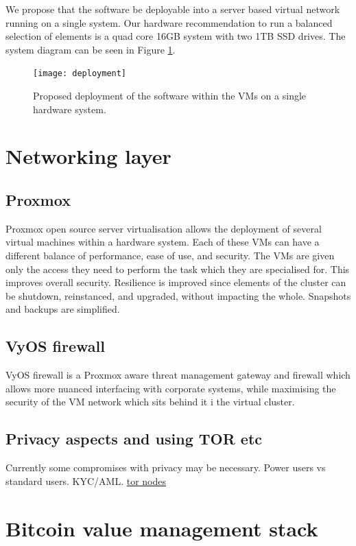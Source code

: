 We propose that the software be deployable into a server based virtual network running on a single system. Our hardware recommendation to run a balanced selection of elements is a quad core 16GB system with two 1TB SSD drives. The system diagram can be seen in Figure \ref{fig:deployment}.
\begin{figure}[ht]\centering %
	\texttt{[image: deployment]}
	\caption{Proposed deployment of the software within the VMs on a single hardware system.}
	\label{fig:deployment}
\end{figure}
\section{Networking layer}
\subsection{Proxmox}
Proxmox open source server virtualisation allows the deployment of several virtual machines within a hardware system. Each of these VMs can have a different balance of performance, ease of use, and security. The VMs are given only the access they need to perform the task which they are specialised for. This improves overall security. Resilience is improved since elements of the cluster can be shutdown, reinstanced, and upgraded, without impacting the whole. Snapshots and backups are simplified.
\subsection{VyOS firewall}
VyOS firewall is a Proxmox aware threat management gateway and firewall which allows more nuanced interfacing with corporate systems, while maximising the security of the VM network which sits behind it i the virtual cluster.
\subsection{Privacy aspects and using TOR etc}
Currently some compromises with privacy may be necessary. Power users vs standard users. KYC/AML. 
\href{https://bitnodes.io/nodes/?q=.onion}{tor nodes}
\section{Bitcoin value management stack}
